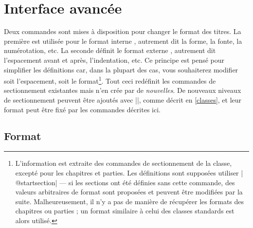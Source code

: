 \documentclass[a4paper]{ltxguide}
\def\gobble#1{}
\def\cs#1{\expandafter\gobble\string\\#1}
\begin{document}
\section{Interface avancée}

Deux commandes sont mises à disposition pour changer le format des titres. La première
est utilisée pour le format \og interne \fg{}, autrement dit la forme, la fonte, 
la numérotation, etc. La seconde définit le format \og externe \fg{}, autrement dit 
l'espacement avant et après, l'indentation, etc. Ce principe est pensé pour simplifier 
les définitions car, dans la plupart des cas, vous souhaiterez modifier soit 
l'espacement, soit le format\footnote{L'information est \og extraite \fg{} des 
commandes de sectionnement de la classe, excepté pour les chapitres et parties. Les
définitions sont supposées utiliser |\cs{@startsection}| --- si les sections ont été
définies sans cette commande, des valeurs arbitraires de format sont proposées et 
peuvent être modifiées par la suite. Malheureusement, il n'y a pas de manière de
récupérer les formats des chapitres ou parties ; un format similaire à celui des 
classes standards est alors utilisé.}. Tout ceci redéfinit les commandes de 
sectionnement existantes mais n'en crée par de \emph{nouvelles}. De nouveaux niveaux
de sectionnement peuvent être ajoutés avec |\titleclass|, comme décrit en 
\ref{classes}, et leur format peut être fixé par les commandes décrites ici.

\subsection{Format}
\end{document}
